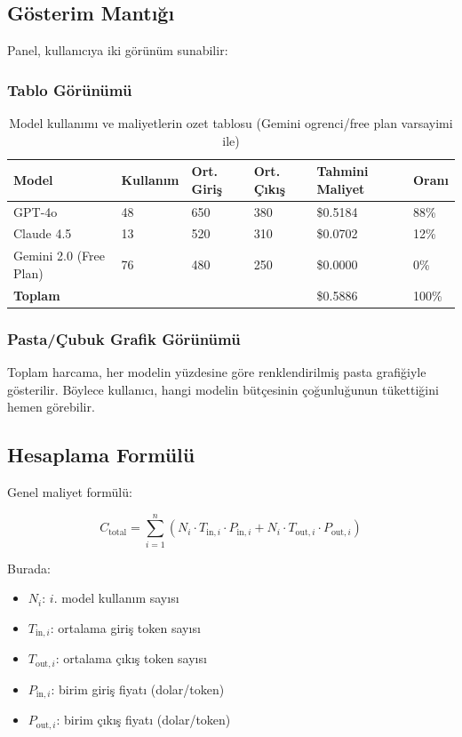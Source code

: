 \documentclass[12pt,a4paper]{article}
\begin{document}
\subsection{Gösterim Mantığı}

Panel, kullanıcıya iki görünüm sunabilir:

\subsubsection{Tablo Görünümü}
\begin{table}[h!]
  \centering\small
  \begin{tabular}{@{} P{2.3cm} P{1.5cm} P{1.8cm} P{1.8cm} P{2.1cm} P{1.5cm} @{}}
    \toprule
    Model & Kullanım & Ort. Giriş & Ort. Çıkış & Tahmini Maliyet & Oranı \\
    \midrule
    GPT-4o & 48 & 650 & 380 & \$0.5184 & 88\% \\
    Claude 4.5 & 13 & 520 & 310 & \$0.0702 & 12\% \\
    Gemini 2.0 (Free Plan) & 76 & 480 & 250 & \$0.0000 & 0\% \\
    \midrule
    \textbf{Toplam} &  &  &  & \$0.5886 & 100\% \\
    \bottomrule
  \end{tabular}
  \caption{Model kullanımı ve maliyetlerin ozet tablosu (Gemini ogrenci/free plan varsayimi ile)}
\end{table}

\subsubsection{Pasta/Çubuk Grafik Görünümü}
Toplam harcama, her modelin yüzdesine göre renklendirilmiş pasta grafiğiyle gösterilir. Böylece kullanıcı, hangi modelin bütçesinin çoğunluğunun tükettiğini hemen görebilir.

\subsection{Hesaplama Formülü}

Genel maliyet formülü:

$$
C_{\text{total}} = \sum_{i=1}^{n} \left( N_i \cdot T_{\text{in},i} \cdot P_{\text{in},i} + N_i \cdot T_{\text{out},i} \cdot P_{\text{out},i} \right)
$$

Burada:
\begin{itemize}[leftmargin=*]
  \item $N_i$: $i$. model kullanım sayısı
  \item $T_{\text{in},i}$: ortalama giriş token sayısı
  \item $T_{\text{out},i}$: ortalama çıkış token sayısı
  \item $P_{\text{in},i}$: birim giriş fiyatı (dolar/token)
  \item $P_{\text{out},i}$: birim çıkış fiyatı (dolar/token)
\end{itemize}
\end{document}
